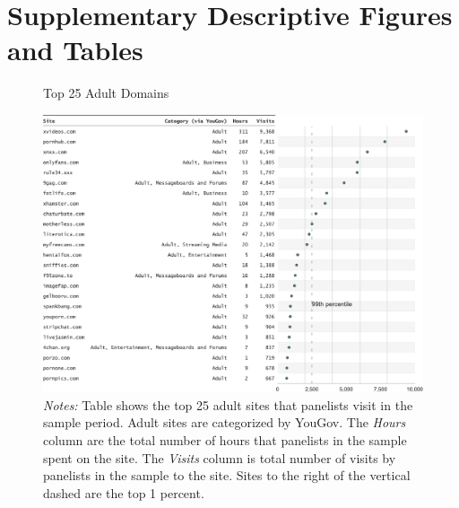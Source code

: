 \documentclass[12pt, letterpaper]{article}
\begin{document}
\section{Supplementary Descriptive Figures and Tables}
\begin{figure}[ht]
	\centering
	\caption{Top 25 Adult Domains}
	\includegraphics[width=\textwidth]{../figs/top_25_adultsites.pdf}
	\caption*{\footnotesize \emph{Notes:} 
		Table shows the top 25 adult sites that panelists visit in the sample period.
		Adult sites are categorized by YouGov.
		The \emph{Hours} column are the total number of hours that panelists in the sample spent on the site. 
		The \emph{Visits} column is total number of visits by panelists in the sample to the site.  
		Sites to the right of the vertical dashed are the top 1 percent.
	}
	\label{fig:top25_adult}
\end{figure}
\end{document}
